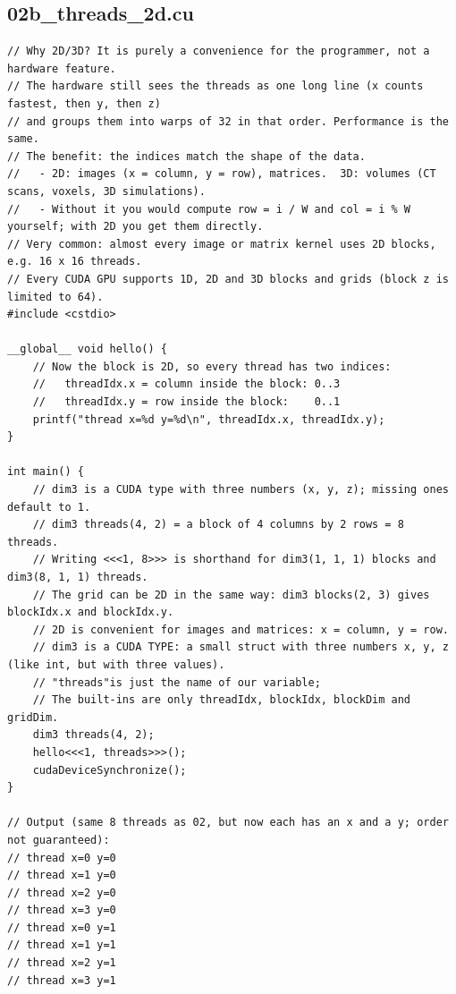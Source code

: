 \documentclass[11pt,a4paper]{article}
\begin{document}
\subsection{02b\_threads\_2d.cu}
\begin{lstlisting}[language=CUDA]
// Why 2D/3D? It is purely a convenience for the programmer, not a hardware feature.
// The hardware still sees the threads as one long line (x counts fastest, then y, then z)
// and groups them into warps of 32 in that order. Performance is the same.
// The benefit: the indices match the shape of the data.
//   - 2D: images (x = column, y = row), matrices.  3D: volumes (CT scans, voxels, 3D simulations).
//   - Without it you would compute row = i / W and col = i % W yourself; with 2D you get them directly.
// Very common: almost every image or matrix kernel uses 2D blocks, e.g. 16 x 16 threads.
// Every CUDA GPU supports 1D, 2D and 3D blocks and grids (block z is limited to 64).
#include <cstdio>

__global__ void hello() {
    // Now the block is 2D, so every thread has two indices:
    //   threadIdx.x = column inside the block: 0..3
    //   threadIdx.y = row inside the block:    0..1
    printf("thread x=%d y=%d\n", threadIdx.x, threadIdx.y);
}

int main() {
    // dim3 is a CUDA type with three numbers (x, y, z); missing ones default to 1.
    // dim3 threads(4, 2) = a block of 4 columns by 2 rows = 8 threads.
    // Writing <<<1, 8>>> is shorthand for dim3(1, 1, 1) blocks and dim3(8, 1, 1) threads.
    // The grid can be 2D in the same way: dim3 blocks(2, 3) gives blockIdx.x and blockIdx.y.
    // 2D is convenient for images and matrices: x = column, y = row.
    // dim3 is a CUDA TYPE: a small struct with three numbers x, y, z (like int, but with three values).
    // "threads"is just the name of our variable; 
    // The built-ins are only threadIdx, blockIdx, blockDim and gridDim.
    dim3 threads(4, 2);
    hello<<<1, threads>>>();
    cudaDeviceSynchronize();
}

// Output (same 8 threads as 02, but now each has an x and a y; order not guaranteed):
// thread x=0 y=0
// thread x=1 y=0
// thread x=2 y=0
// thread x=3 y=0
// thread x=0 y=1
// thread x=1 y=1
// thread x=2 y=1
// thread x=3 y=1
\end{lstlisting}
\end{document}
